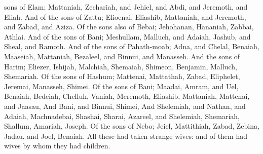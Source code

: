 {sons of
Elam;
Mattaniah,
Zechariah, and
Jehiel, and
Abdi, and
Jeremoth, and
Eliah.
And of the
sons of
Zattu;
Elioenai,
Eliashib,
Mattaniah, and
Jeremoth, and
Zabad, and
Aziza.
Of the
sons also of
Bebai;
Jehohanan,
Hananiah,
Zabbai,
{}
Athlai.
And of the
sons of
Bani;
Meshullam,
Malluch, and
Adaiah,
Jashub, and
Sheal, and
Ramoth.
And of the
sons of
Pahath-moab;
Adna, and
Chelal,
Benaiah,
Maaseiah,
Mattaniah,
Bezaleel, and
Binnui, and
Manasseh.
And
{} the
sons of
Harim;
Eliezer,
Ishijah,
Malchiah,
Shemaiah,
Shimeon,
Benjamin,
Malluch,
{}
Shemariah.
Of the
sons of
Hashum;
Mattenai,
Mattathah,
Zabad,
Eliphelet,
Jeremai,
Manasseh,
{}
Shimei.
Of the
sons of
Bani;
Maadai,
Amram, and
Uel,
Benaiah,
Bedeiah,
Chelluh,
Vaniah,
Meremoth,
Eliashib,
Mattaniah,
Mattenai, and
Jaasau,
And
Bani, and
Binnui,
Shimei,
And
Shelemiah, and
Nathan, and
Adaiah,
Machnadebai,
Shashai,
Sharai,
Azareel, and
Shelemiah,
Shemariah,
Shallum,
Amariah,
{}
Joseph.
Of the
sons of
Nebo;
Jeiel,
Mattithiah,
Zabad,
Zebina,
Jadau, and
Joel,
Benaiah.
All these had
taken
strange
wives: and
{} of them
had
wives by whom they
had
children.
\par }